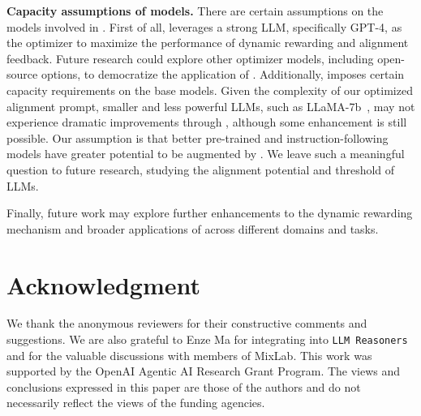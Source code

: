 \noindent \textbf{Capacity assumptions of models.} 
There are certain assumptions on the models involved in \ours. First of all, \ours leverages a strong LLM, specifically GPT-4, as the optimizer to maximize the performance of dynamic rewarding and alignment feedback. Future research could explore other optimizer models, including open-source options, to democratize the application of \ours. Additionally, \ours imposes certain capacity requirements on the base models. Given the complexity of our optimized alignment prompt, smaller and less powerful LLMs, such as LLaMA-7b~\cite{touvron2023llama}, may not experience dramatic improvements through \ours, although some enhancement is still possible. Our assumption is that better pre-trained and instruction-following models have greater potential to be augmented by \ours. We leave such a meaningful question to future research, studying the alignment potential and threshold of LLMs. 


Finally, future work may explore further enhancements to the dynamic rewarding mechanism and broader applications of \ours across different domains and tasks.


\section*{Acknowledgment}

We thank the anonymous reviewers for their constructive comments and suggestions. We are also grateful to Enze Ma for integrating \ours into \texttt{LLM Reasoners} and for the valuable discussions with members of MixLab. This work was supported by the OpenAI Agentic AI Research Grant Program. The views and conclusions expressed in this paper are those of the authors and do not necessarily reflect the views of the funding agencies.




